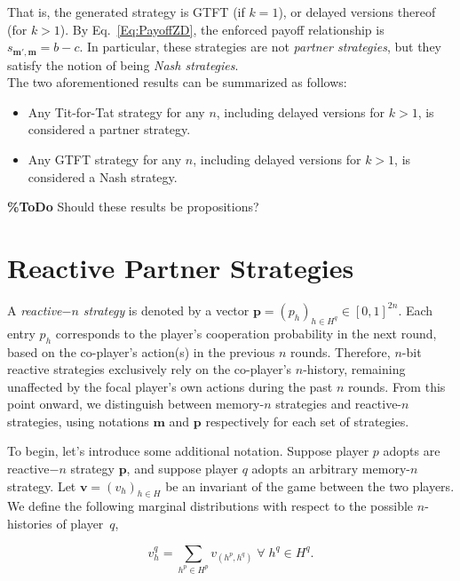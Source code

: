 \documentclass{article}
\theoremstyle{definition}
\begin{document}
That is, the generated strategy is GTFT (if $k\!=\!1$), or delayed versions
thereof (for $k\!>\!1$). By Eq.~\eqref{Eq:PayoffZD}, the enforced payoff
relationship is $s_{\mathbf{m'}, \mathbf{m}}\!=\!b\!-\!c$. In particular, these
strategies are not {\it partner strategies}, but they satisfy the notion of
being {\it Nash strategies}.\\

The two aforementioned results can be summarized as follows:

\begin{itemize}
  \item Any Tit-for-Tat strategy for any $n$, including delayed versions for $k > 1$,
  is considered a partner strategy.
  \item Any GTFT strategy for any $n$, including delayed versions for $k > 1$,
  is considered a Nash strategy.
\end{itemize}

{\bf \%ToDo} Should these results be propositions?

\section{Reactive Partner Strategies}\label{section:reactive_strategies}

A {\it reactive$-n$ strategy} is denoted by a vector
$\mathbf{p}=(p_h)_{h\in H^q}\in[0,1]^{2n}$. Each entry $p_h$ corresponds to the
player's cooperation probability in the next round, based on the co-player's
action(s) in the previous $n$ rounds. Therefore, $n$-bit reactive strategies
exclusively rely on the co-player's $n$-history, remaining unaffected by the
focal player's own actions during the past $n$ rounds. From this point onward,
we distinguish between memory-$n$ strategies and reactive-$n$ strategies, using
notations $\mathbf{m}$ and $\mathbf{p}$ respectively for each set of strategies.

To begin, let's introduce some additional notation. Suppose player $p$ adopts
are reactive$-n$ strategy $\mathbf{p}$, and suppose player $q$ adopts an
arbitrary memory-$n$ strategy. Let $\mathbf{v}=(v_h)_{h\in H}$ be an invariant
of the game between the two players. We define the following marginal
distributions with respect to the possible $n$-histories of player~$q$,

\begin{equation}\label{Eq:marginal_distributions}
\displaystyle v^q_{h} = \sum_{h^p\in H^p} v_{(h^p,h^q)} \; \forall \; h^q \in H^q.
\end{equation}
\end{document}
